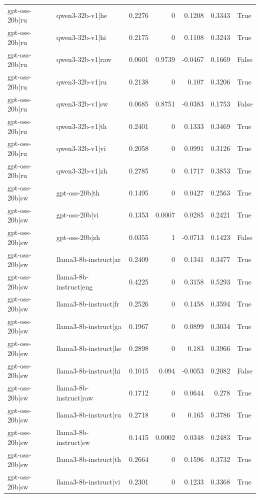 \begin{table}
\begin{tabular}{l l r r r r l}
gpt-oss-20b|ru & qwen3-32b-v1|he & 0.2276 & 0 & 0.1208 & 0.3343 & True \\
gpt-oss-20b|ru & qwen3-32b-v1|hi & 0.2175 & 0 & 0.1108 & 0.3243 & True \\
gpt-oss-20b|ru & qwen3-32b-v1|raw & 0.0601 & 0.9739 & -0.0467 & 0.1669 & False \\
gpt-oss-20b|ru & qwen3-32b-v1|ru & 0.2138 & 0 & 0.107 & 0.3206 & True \\
gpt-oss-20b|ru & qwen3-32b-v1|sw & 0.0685 & 0.8751 & -0.0383 & 0.1753 & False \\
gpt-oss-20b|ru & qwen3-32b-v1|th & 0.2401 & 0 & 0.1333 & 0.3469 & True \\
gpt-oss-20b|ru & qwen3-32b-v1|vi & 0.2058 & 0 & 0.0991 & 0.3126 & True \\
gpt-oss-20b|ru & qwen3-32b-v1|zh & 0.2785 & 0 & 0.1717 & 0.3853 & True \\
gpt-oss-20b|sw & gpt-oss-20b|th & 0.1495 & 0 & 0.0427 & 0.2563 & True \\
gpt-oss-20b|sw & gpt-oss-20b|vi & 0.1353 & 0.0007 & 0.0285 & 0.2421 & True \\
gpt-oss-20b|sw & gpt-oss-20b|zh & 0.0355 & 1 & -0.0713 & 0.1423 & False \\
gpt-oss-20b|sw & llama3-8b-instruct|ar & 0.2409 & 0 & 0.1341 & 0.3477 & True \\
gpt-oss-20b|sw & llama3-8b-instruct|eng & 0.4225 & 0 & 0.3158 & 0.5293 & True \\
gpt-oss-20b|sw & llama3-8b-instruct|fr & 0.2526 & 0 & 0.1458 & 0.3594 & True \\
gpt-oss-20b|sw & llama3-8b-instruct|ga & 0.1967 & 0 & 0.0899 & 0.3034 & True \\
gpt-oss-20b|sw & llama3-8b-instruct|he & 0.2898 & 0 & 0.183 & 0.3966 & True \\
gpt-oss-20b|sw & llama3-8b-instruct|hi & 0.1015 & 0.094 & -0.0053 & 0.2082 & False \\
gpt-oss-20b|sw & llama3-8b-instruct|raw & 0.1712 & 0 & 0.0644 & 0.278 & True \\
gpt-oss-20b|sw & llama3-8b-instruct|ru & 0.2718 & 0 & 0.165 & 0.3786 & True \\
gpt-oss-20b|sw & llama3-8b-instruct|sw & 0.1415 & 0.0002 & 0.0348 & 0.2483 & True \\
gpt-oss-20b|sw & llama3-8b-instruct|th & 0.2664 & 0 & 0.1596 & 0.3732 & True \\
gpt-oss-20b|sw & llama3-8b-instruct|vi & 0.2301 & 0 & 0.1233 & 0.3368 & True \\

\end{tabular}
\end{table}
